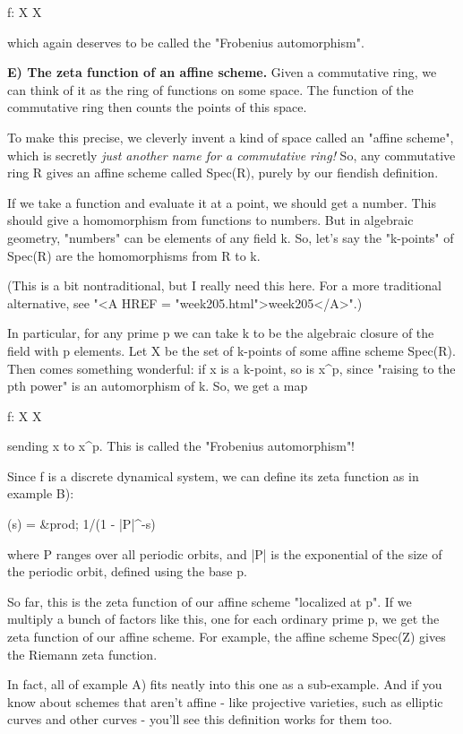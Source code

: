 f: X \to  X

which again deserves to be called the "Frobenius automorphism".

\textbf{E) The zeta function of an affine scheme.}  Given a commutative ring, 
we can think of it as the ring of functions on some space.  The \zeta  
function of the commutative ring then counts the points of this space.

To make this precise, we cleverly invent a kind of space called an 
"affine scheme", which is secretly 
\emph{just another name for a commutative ring!}
So, any commutative ring R gives an affine scheme called Spec(R), 
purely by our fiendish definition.

If we take a function and evaluate it at a point, we should get a number.
This should give a homomorphism from functions to numbers.  But in
algebraic geometry, "numbers" can be elements of any field k.  So, let's 
say the "k-points" of Spec(R) are the homomorphisms from R to k.  

(This is a bit nontraditional, but I really need this here.
For a more traditional alternative, see "<A HREF = "week205.html">week205</A>".)

In particular, for any prime p we can take k to be the algebraic
closure of the field with p elements.  Let X be the set of k-points 
of some affine scheme Spec(R).   Then comes something wonderful: 
if x is a k-point, so is x^{p}, 
since "raising to the pth power" is an 
automorphism of k.  So, we get a map

f: X \to  X

sending x to x^{p}.  
This is called the "Frobenius automorphism"!

Since f is a discrete dynamical system, we can define its zeta function
as in example B):

\zeta (s) = &prod; 1/(1 - |P|^{-s})

where P ranges over all periodic orbits, and |P| is the exponential
of the size of the periodic orbit, defined using the base p.

So far, this 
is the zeta function of our affine scheme "localized at p".
If we multiply a bunch of factors like this, one for each ordinary
prime p, we get the zeta function of our affine scheme.
For example, the affine scheme Spec(Z) gives the Riemann zeta function.

In fact, all of example A) fits neatly into this one as a sub-example.
And if you know about schemes that aren't affine - like projective
varieties, such as elliptic curves and other curves - you'll see 
this definition works for them too.

